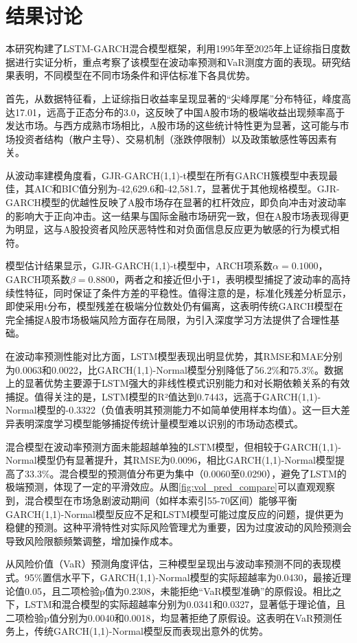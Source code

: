 \documentclass[12pt, a4paper]{article}
\begin{document}
\section{结果讨论}

本研究构建了LSTM-GARCH混合模型框架，利用1995年至2025年上证综指日度数据进行实证分析，重点考察了该模型在波动率预测和VaR测度方面的表现。研究结果表明，不同模型在不同市场条件和评估标准下各具优势。

首先，从数据特征看，上证综指日收益率呈现显著的“尖峰厚尾”分布特征，峰度高达17.01，远高于正态分布的3.0，这反映了中国A股市场的极端收益出现频率高于发达市场。与西方成熟市场相比，A股市场的这些统计特性更为显著，这可能与市场投资者结构（散户主导）、交易机制（涨跌停限制）以及政策敏感性等因素有关。

从波动率建模角度看，GJR-GARCH(1,1)-t模型在所有GARCH簇模型中表现最佳，其AIC和BIC值分别为-42,629.6和-42,581.7，显著优于其他规格模型。GJR-GARCH模型的优越性反映了A股市场存在显著的杠杆效应，即负向冲击对波动率的影响大于正向冲击。这一结果与国际金融市场研究一致，但在A股市场表现得更为明显，这与A股投资者风险厌恶特性和对负面信息反应更为敏感的行为模式相符。

模型估计结果显示，GJR-GARCH(1,1)-t模型中，ARCH项系数$\alpha = 0.1000$，GARCH项系数$\beta = 0.8800$，两者之和接近但小于1，表明模型捕捉了波动率的高持续性特征，同时保证了条件方差的平稳性。值得注意的是，标准化残差分析显示，即使采用t分布，模型残差在极端分位数处仍有偏离，这表明传统GARCH模型在完全捕捉A股市场极端风险方面存在局限，为引入深度学习方法提供了合理性基础。

在波动率预测性能对比方面，LSTM模型表现出明显优势，其RMSE和MAE分别为0.0063和0.0022，比GARCH(1,1)-Normal模型分别降低了56.2\%和75.3\%。数据上的显著优势主要源于LSTM强大的非线性模式识别能力和对长期依赖关系的有效捕捉。值得关注的是，LSTM模型的R²值达到0.7443，远高于GARCH(1,1)-Normal模型的-0.3322（负值表明其预测能力不如简单使用样本均值）。这一巨大差异表明深度学习模型能够捕捉传统计量模型难以识别的市场动态模式。

混合模型在波动率预测方面未能超越单独的LSTM模型，但相较于GARCH(1,1)-Normal模型仍有显著提升，其RMSE为0.0096，相比GARCH(1,1)-Normal模型提高了33.3\%。混合模型的预测值分布更为集中（0.0060至0.0290），避免了LSTM的极端预测，体现了一定的平滑效应。从图\ref{fig:vol_pred_compare}可以直观观察到，混合模型在市场急剧波动期间（如样本索引55-70区间）能够平衡GARCH(1,1)-Normal模型反应不足和LSTM模型可能过度反应的问题，提供更为稳健的预测。这种平滑特性对实际风险管理尤为重要，因为过度波动的风险预测会导致风险限额频繁调整，增加操作成本。

从风险价值（VaR）预测角度评估，三种模型呈现出与波动率预测不同的表现模式。95\%置信水平下，GARCH(1,1)-Normal模型的实际超越率为0.0430，最接近理论值0.05，且二项检验p值为0.2308，未能拒绝“VaR模型准确”的原假设。相比之下，LSTM和混合模型的实际超越率分别为0.0341和0.0327，显著低于理论值，且二项检验p值分别为0.0040和0.0018，均显著拒绝了原假设。这表明在VaR预测任务上，传统GARCH(1,1)-Normal模型反而表现出意外的优势。
\end{document}
